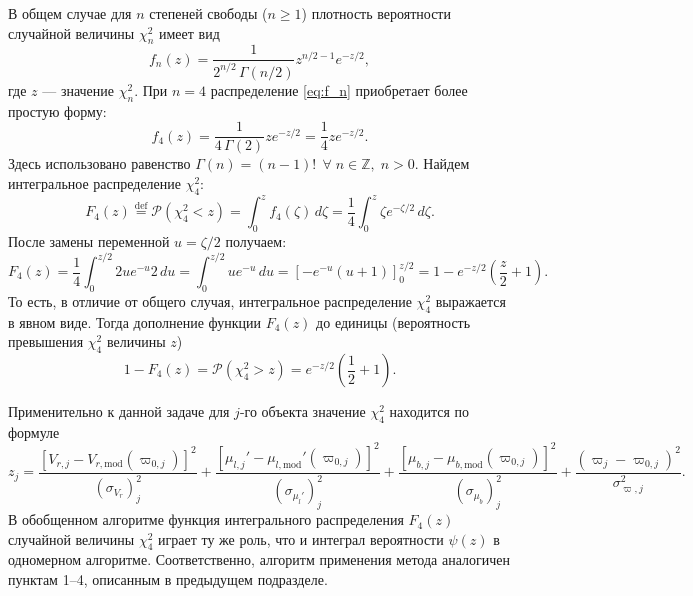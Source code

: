 \documentclass[a4paper, oneside, 14pt]{article}
\begin{document}
В общем случае для $ n $ степеней свободы ($ n \ge 1 $) плотность вероятности случайной величины $ \chi_n^2 $ имеет вид
%
\begin{equation}
  \label{eq:f_n}
  f_n(z) = \frac{1}{2^{n/2} \, \Gamma(n / 2)} z^{n / 2 - 1} e^{-z / 2},
\end{equation}
%
где $ z $ --- значение $ \chi_n^2 $. При $ n = 4 $ распределение \eqref{eq:f_n} приобретает более простую форму:
%
\begin{equation}
  f_4(z) = \frac{1}{4 \, \Gamma(2)} z e^{-z / 2} = \frac{1}{4} z e^{-z / 2}.
\end{equation}
%
Здесь использовано равенство $ \Gamma(n) = (n - 1)! \;\, \forall \; n \in \mathbb{Z}, \; n > 0 $. Найдем интегральное распределение $ \chi_4^2 $:
%
\begin{equation}
  F_4(z) \stackrel{\text{def}}{=} \mathcal{P}(\chi_4^2 < z) = \int_0^z f_4(\zeta) \, d\zeta = \frac{1}{4} \int_0^z \zeta e^{-\zeta / 2} \, d\zeta.
\end{equation}
%
После замены переменной $ u = \zeta / 2 $ получаем:
%
\begin{equation}
  F_4(z) = \frac{1}{4} \int_0^{z / 2} 2 u e^{-u} 2 \, du = \int_0^{z / 2} u e^{-u} \, du = \left[ -e^{-u} (u + 1) \right]_0^{z / 2} = 1 - e^{-z / 2} \left( \frac{z}{2} + 1 \right).
\end{equation}
%
То есть, в отличие от общего случая, интегральное распределение $ \chi_4^2 $ выражается в явном виде. Тогда дополнение функции $ F_4(z) $ до единицы (вероятность превышения $ \chi_4^2 $ величины $ z $)
%
\begin{equation}
  1 - F_4(z) = \mathcal{P}(\chi_4^2 > z) = e^{-z / 2} \left( \frac{1}{2} + 1 \right).
\end{equation}

Применительно к данной задаче для $j$-го объекта значение $ \chi_4^2 $ находится по формуле
%
\begin{equation}
  z_j = \frac{[ V_{r,j} - V_{r,\text{mod}}(\varpi_{0,j}) ]^2}{(\sigma_{V_r})_j^2} + \frac{[ \mu_{l,j}' - \mu_{l,\text{mod}}'(\varpi_{0,j}) ]^2}{(\sigma_{\mu_l'})_j^2} + \frac{[ \mu_{b,j} - \mu_{b,\text{mod}}(\varpi_{0,j}) ]^2}{(\sigma_{\mu_b})_j^2} + \frac{( \varpi_j - \varpi_{0,j} )^2}{\sigma_{\varpi,j}^2}.
\end{equation}
%
В обобщенном алгоритме функция интегрального распределения $ F_4(z) $ случайной величины $ \chi_4^2 $ играет ту же роль, что и интеграл вероятности $ \psi(z) $ в одномерном алгоритме. Соответственно, алгоритм применения метода аналогичен пунктам 1--4, описанным в предыдущем подразделе.
\end{document}

